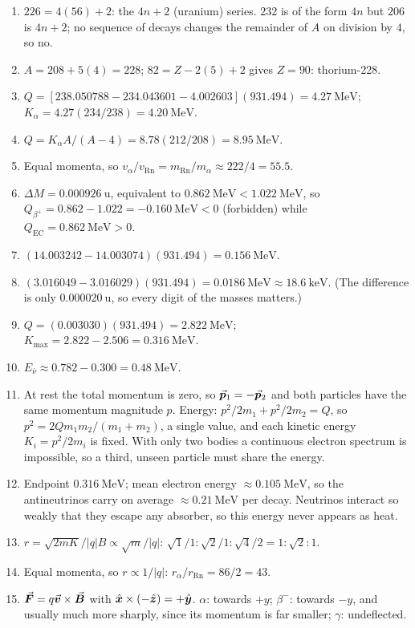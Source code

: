 {\begin{enumerate}[itemsep=2pt]
\item $226=4(56)+2$: the $4n+2$ (uranium) series. $232$ is of the form $4n$ but $206$ is $4n+2$; no
      sequence of decays changes the remainder of $A$ on division by $4$, so no.
\item $A=208+5(4)=228$; $82=Z-2(5)+2$ gives $Z=90$: thorium-228.
\item $Q=[238.050788-234.043601-4.002603](931.494)=\SI{4.27}{\MeV}$; $K_\alpha=4.27(234/238)=\SI{4.20}{\MeV}$.
\item $Q=K_\alpha A/(A-4)=8.78(212/208)=\SI{8.95}{\MeV}$.
\item Equal momenta, so $v_\alpha/v_{\mathrm{Rn}}=m_{\mathrm{Rn}}/m_\alpha\approx222/4=55.5$.
\item $\Delta M=\SI{0.000926}{\amu}$, equivalent to $\SI{0.862}{\MeV}<\SI{1.022}{\MeV}$, so
      $Q_{\beta^+}=0.862-1.022=\SI{-0.160}{\MeV}<0$ (forbidden) while $Q_{\mathrm{EC}}=\SI{0.862}{\MeV}>0$.
\item $(14.003242-14.003074)(931.494)=\SI{0.156}{\MeV}$.
\item $(3.016049-3.016029)(931.494)=\SI{0.0186}{\MeV}\approx\SI{18.6}{\keV}$. (The difference is only
      $\SI{0.000020}{\amu}$, so every digit of the masses matters.)
\item $Q=(0.003030)(931.494)=\SI{2.822}{\MeV}$; $K_{\max}=2.822-2.506=\SI{0.316}{\MeV}$.
\item $E_{\bar\nu}\approx0.782-0.300=\SI{0.48}{\MeV}$.
\item At rest the total momentum is zero, so $\vec{\bm{p}}_1=-\vec{\bm{p}}_2$ and both particles have the same momentum
      magnitude $p$. Energy: $p^2/2m_1+p^2/2m_2=Q$, so $p^2=2Qm_1m_2/(m_1+m_2)$, a single value, and each
      kinetic energy $K_i=p^2/2m_i$ is fixed. With only two bodies a continuous electron spectrum is
      impossible, so a third, unseen particle must share the energy.
\item Endpoint $\SI{0.316}{\MeV}$; mean electron energy $\approx\SI{0.105}{\MeV}$, so the antineutrinos carry
      on average $\approx\SI{0.21}{\MeV}$ per decay. Neutrinos interact so weakly that they escape any
      absorber, so this energy never appears as heat.
\item $r=\sqrt{2mK}/|q|B\propto\sqrt m/|q|$: $\sqrt1/1:\sqrt2/1:\sqrt4/2=1:\sqrt2:1$.
\item Equal momenta, so $r\propto1/|q|$: $r_\alpha/r_{\mathrm{Rn}}=86/2=43$.
\item $\vec{\bm{F}}=q\vec{\bm{v}}\times\vec{\bm{B}}$ with $\hat{\bm{x}}\times(-\hat{\bm{z}})=+\hat{\bm{y}}$. $\alpha$: towards $+y$; $\beta^-$: towards
      $-y$, and usually much more sharply, since its momentum is far smaller; $\gamma$: undeflected.
\end{enumerate}
}

